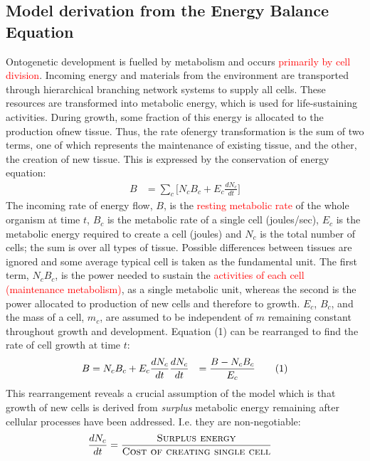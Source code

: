 \documentclass[a4paper]{article} %
\newcommand\numberthis{\addtocounter{equation}{1}\tag{\theequation}}
\begin{document}
\subsection{Model derivation from the Energy Balance Equation}
Ontogenetic development is fuelled by metabolism and occurs \textcolor{red}{primarily by cell division}. Incoming energy and materials from the environment are transported through hierarchical branching network systems to supply all cells. These resources are transformed into metabolic energy, which is used for life-sustaining activities. During growth, some fraction of this energy is allocated to the production ofnew tissue. Thus, the rate ofenergy transformation is the sum of two terms, one of which represents the maintenance of existing tissue, and the other, the creation of new tissue. This is expressed by the conservation of energy equation:
\begin{align}
    B &= \sum_c \Bigg[N_{c}B_{c} + E_{c}\frac{dN_{c}}{dt}\Bigg]
\end{align}
The incoming rate of energy flow, $B$, is the \textcolor{red}{resting metabolic rate} of the whole organism at time $t$, $B_c$ is the metabolic rate of a single cell (joules/sec), $E_c$ is the metabolic energy required to create a cell (joules) and $N_c$ is the total number of cells; the sum is over all types of tissue. Possible differences between tissues are ignored and some average typical cell is taken as the fundamental unit. The first term, $N_{c}B_{c}$, is the power needed to sustain the \textcolor{red}{activities of each cell (maintenance metabolism)}, as a single metabolic unit, whereas the second is the power allocated to production of new cells and therefore to growth. $E_c$, $B_c$, and the mass of a cell, $m_c$, are assumed to be independent of $m$ remaining constant throughout growth and development. Equation (1) can be rearranged to find the rate of cell growth at time $t$: 
\begin{align*}
    B &= N_{c}B_{c} + E_{c}\frac{dN_{c}}{dt}
    \frac{dN_{c}}{dt} &= \frac{B - N_{c}B_{c}}{E_{c}} \numberthis \label{cell_rate}
\end{align*}
This rearrangement reveals a crucial assumption of the model which is that growth of new cells is derived from \textit{surplus} metabolic energy remaining after cellular processes have been addressed. I.e. they are non-negotiable:
\begin{align*}    
    \frac{dN_{c}}{dt} &= \frac{\textsc{Surplus energy}}{\textsc{Cost of creating single cell}}
\end{align*}
\end{document}
